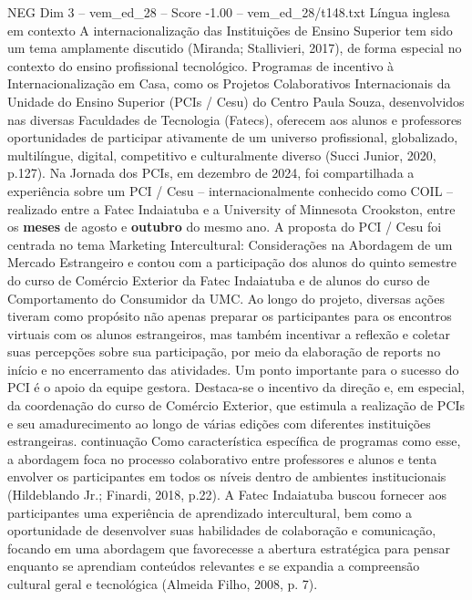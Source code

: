 \begin{textsample}{NEG Dim 3 – vem\_ed\_28 – Score -1.00 – vem\_ed\_28/t148.txt}  \label{ex:f3_neg_071}
Língua inglesa em contexto A internacionalização das Instituições de Ensino Superior tem sido um tema amplamente discutido (Miranda; Stallivieri, 2017), de forma especial no contexto do ensino profissional tecnológico.
Programas de incentivo à Internacionalização em Casa, como os Projetos Colaborativos Internacionais da Unidade do Ensino Superior (PCIs / Cesu) do Centro Paula Souza, desenvolvidos nas diversas Faculdades de Tecnologia (Fatecs), oferecem aos alunos e professores oportunidades de participar ativamente de um universo profissional, globalizado, multilíngue, digital, competitivo e culturalmente diverso (Succi Junior, 2020, p.127).
Na Jornada dos PCIs, em dezembro de 2024, foi compartilhada a experiência sobre um PCI / Cesu – internacionalmente conhecido como COIL – realizado entre a Fatec Indaiatuba e a University of Minnesota Crookston, entre os \textbf{meses} de agosto e \textbf{outubro} do mesmo ano.
A proposta do PCI / Cesu foi centrada no tema Marketing Intercultural: Considerações na Abordagem de um Mercado Estrangeiro e contou com a participação dos alunos do quinto semestre do curso de Comércio Exterior da Fatec Indaiatuba e de alunos do curso de Comportamento do Consumidor da UMC.
Ao longo do projeto, diversas ações tiveram como propósito não apenas preparar os participantes para os encontros virtuais com os alunos estrangeiros, mas também incentivar a reflexão e coletar suas percepções sobre sua participação, por meio da elaboração de reports no início e no encerramento das atividades.
Um ponto importante para o sucesso do PCI é o apoio da equipe gestora.
Destaca-se o incentivo da direção e, em especial, da coordenação do curso de Comércio Exterior, que estimula a realização de PCIs e seu amadurecimento ao longo de várias edições com diferentes instituições estrangeiras. continuação Como característica específica de programas como esse, a abordagem foca no processo colaborativo entre professores e alunos e tenta envolver os participantes em todos os níveis dentro de ambientes institucionais (Hildeblando Jr.; Finardi, 2018, p.22).
A Fatec Indaiatuba buscou fornecer aos participantes uma experiência de aprendizado intercultural, bem como a oportunidade de desenvolver suas habilidades de colaboração e comunicação, focando em uma abordagem que favorecesse a abertura estratégica para pensar enquanto se aprendiam conteúdos relevantes e se expandia a compreensão cultural geral e tecnológica (Almeida Filho, 2008, p. 7).

\end{textsample}
